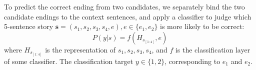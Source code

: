 To predict the correct ending from two candidates,
we separately bind the two candidate endings to the context sentences,
and apply a classifier to judge
which 5-sentence story $\textbf{s}=(s_1, s_2, s_3, s_4, e),e\in\{e_1,e_2\}$
is more likely to be correct:
\begin{equation}
P( y|s )= f (H_{s_{[1:4]}}, e) 
\end{equation}
where $H_{s_{[1:4]}}$ is the representation of ${s_1, s_2, s_3, s_4}$,
and $f$ is the classification layer of some classifier.
The classification target $y \in \{1,2\}$, corresponding to $e_1$ and $e_2$.
